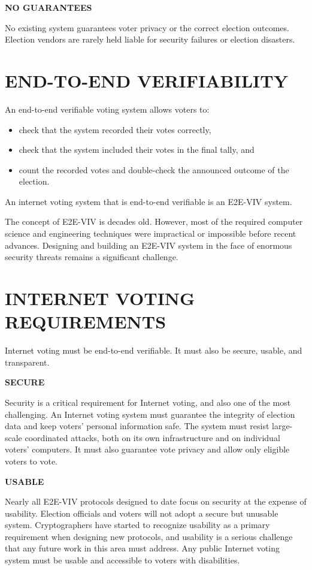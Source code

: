 \noindent \textbf{NO GUARANTEES}

No existing system guarantees voter privacy or the correct election
outcomes.  Election vendors are rarely held liable for security
failures or election disasters.

\newpage

\section*{END-TO-END VERIFIABILITY}

An end-to-end verifiable voting system allows voters to:
\begin{itemize}
\item check that the system recorded their votes correctly,
\item check that the system included their votes in the final tally,
  and
\item count the recorded votes and double-check the announced outcome
  of the election.
\end{itemize}

An internet voting system that is end-to-end verifiable is an E2E-VIV
system.

The concept of E2E-VIV is decades old. However, most of the required
computer science and engineering techniques were impractical or
impossible before recent advances. Designing and building an E2E-VIV
system in the face of enormous security threats remains a significant
challenge. 

\section*{INTERNET VOTING REQUIREMENTS}

Internet voting must be end-to-end verifiable. It must also be secure,
usable, and transparent.

\noindent \textbf{SECURE}

Security is a critical requirement for Internet voting, and also one
of the most challenging. An Internet voting system must guarantee the
integrity of election data and keep voters' personal information
safe. The system must resist large-scale coordinated attacks, both on
its own infrastructure and on individual voters' computers. It must
also guarantee vote privacy and allow only eligible voters to vote.

\noindent \textbf{USABLE}

Nearly all E2E-VIV protocols designed to date focus on security at the
expense of usability. Election officials and voters will not adopt a
secure but unusable system. Cryptographers have started to recognize
usability as a primary requirement when designing new protocols, and
usability is a serious challenge that any future work in this area
must address. Any public Internet voting system must be usable and
accessible to voters with disabilities.


